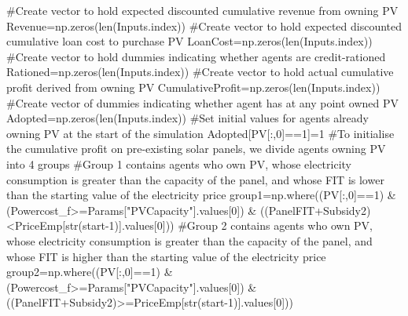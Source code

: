 \documentclass[
  letterpaper,
  DIV=11,
  numbers=noendperiod]{scrartcl}
\newenvironment{Shaded}{\begin{snugshade}}{\end{snugshade}}
\newcommand{\BuiltInTok}[1]{\textcolor[rgb]{0.00,0.23,0.31}{#1}}
\newcommand{\CommentTok}[1]{\textcolor[rgb]{0.37,0.37,0.37}{#1}}
\newcommand{\DecValTok}[1]{\textcolor[rgb]{0.68,0.00,0.00}{#1}}
\newcommand{\NormalTok}[1]{\textcolor[rgb]{0.00,0.23,0.31}{#1}}
\newcommand{\OperatorTok}[1]{\textcolor[rgb]{0.37,0.37,0.37}{#1}}
\newcommand{\StringTok}[1]{\textcolor[rgb]{0.13,0.47,0.30}{#1}}
\begin{document}
\begin{Shaded}
\begin{Highlighting}[]
    \CommentTok{\#Create vector to hold expected discounted cumulative revenue from owning PV}
\NormalTok{    Revenue}\OperatorTok{=}\NormalTok{np.zeros(}\BuiltInTok{len}\NormalTok{(Inputs.index))}
    \CommentTok{\#Create vector to hold expected discounted cumulative loan cost to purchase PV}
\NormalTok{    LoanCost}\OperatorTok{=}\NormalTok{np.zeros(}\BuiltInTok{len}\NormalTok{(Inputs.index))}
    \CommentTok{\#Create vector to hold dummies indicating whether agents are credit{-}rationed}
\NormalTok{    Rationed}\OperatorTok{=}\NormalTok{np.zeros(}\BuiltInTok{len}\NormalTok{(Inputs.index))}
    \CommentTok{\#Create vector to hold actual cumulative profit derived from owning PV}
\NormalTok{    CumulativeProfit}\OperatorTok{=}\NormalTok{np.zeros(}\BuiltInTok{len}\NormalTok{(Inputs.index))}
    \CommentTok{\#Create vector of dummies indicating whether agent has at any point owned PV}
\NormalTok{    Adopted}\OperatorTok{=}\NormalTok{np.zeros(}\BuiltInTok{len}\NormalTok{(Inputs.index))}
    \CommentTok{\#Set initial values for agents already owning PV at the start of the simulation}
\NormalTok{    Adopted[PV[:,}\DecValTok{0}\NormalTok{]}\OperatorTok{==}\DecValTok{1}\NormalTok{]}\OperatorTok{=}\DecValTok{1}
    \CommentTok{\#To initialise the cumulative profit on pre{-}existing solar panels, we divide agents owning PV into 4 groups}
    \CommentTok{\#Group 1 contains agents who own PV, whose electricity consumption is greater than the capacity of the panel, and whose FIT is lower than the starting value of the electricity price}
\NormalTok{    group1}\OperatorTok{=}\NormalTok{np.where((PV[:,}\DecValTok{0}\NormalTok{]}\OperatorTok{==}\DecValTok{1}\NormalTok{) }\OperatorTok{\&}\NormalTok{ (Powercost\_f}\OperatorTok{\textgreater{}=}\NormalTok{Params[}\StringTok{"PVCapacity"}\NormalTok{].values[}\DecValTok{0}\NormalTok{]) }\OperatorTok{\&}\NormalTok{ ((PanelFIT}\OperatorTok{+}\NormalTok{Subsidy2)}\OperatorTok{\textless{}}\NormalTok{PriceEmp[}\BuiltInTok{str}\NormalTok{(start}\OperatorTok{{-}}\DecValTok{1}\NormalTok{)].values[}\DecValTok{0}\NormalTok{]))}
    \CommentTok{\#Group 2 contains agents who own PV, whose electricity consumption is greater than the capacity of the panel, and whose FIT is higher than the starting value of the electricity price}
\NormalTok{    group2}\OperatorTok{=}\NormalTok{np.where((PV[:,}\DecValTok{0}\NormalTok{]}\OperatorTok{==}\DecValTok{1}\NormalTok{) }\OperatorTok{\&}\NormalTok{ (Powercost\_f}\OperatorTok{\textgreater{}=}\NormalTok{Params[}\StringTok{"PVCapacity"}\NormalTok{].values[}\DecValTok{0}\NormalTok{]) }\OperatorTok{\&}\NormalTok{ ((PanelFIT}\OperatorTok{+}\NormalTok{Subsidy2)}\OperatorTok{\textgreater{}=}\NormalTok{PriceEmp[}\BuiltInTok{str}\NormalTok{(start}\OperatorTok{{-}}\DecValTok{1}\NormalTok{)].values[}\DecValTok{0}\NormalTok{]))}

\end{Highlighting}
\end{Shaded}
\end{document}
